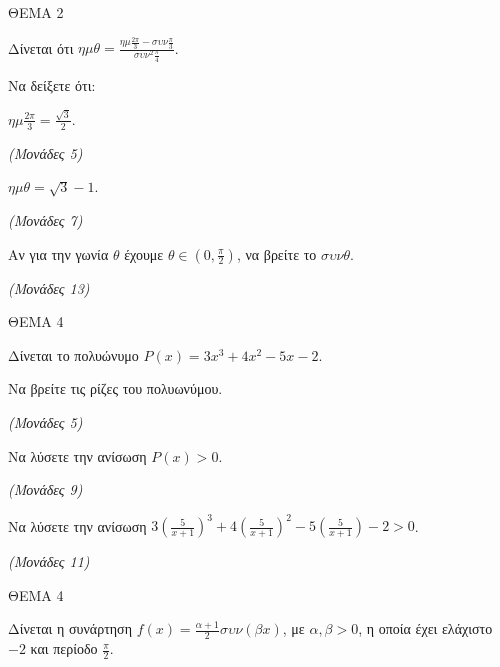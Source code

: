 \documentclass[11pt,a4paper,twoside]{book}
\newcommand{\monades}[1]{\hfill \textit{(Μονάδες #1)}}
\begin{document}
\vspace{4mm}

ΘΕΜΑ 2

Δίνεται ότι $\eta\mu\theta = \frac{\eta\mu\frac{2\pi}{3} - \sigma\upsilon\nu\frac{\pi}{3}}{\sigma\upsilon\nu^2\frac{\pi}{4}}$.

\begin{alist}
\item Να δείξετε ότι:

\begin{rlist}
\item $\eta\mu\frac{2\pi}{3} = \frac{\sqrt{3}}{2}$.

\monades{5}

\item $\eta\mu\theta = \sqrt{3} - 1$.

\monades{7}

\end{rlist}
\item Αν για την γωνία $\theta$ έχουμε $\theta \in \left(0, \frac{\pi}{2}\right)$, να βρείτε το $\sigma\upsilon\nu\theta$.

\monades{13}
\end{alist}

\vspace{4mm}

ΘΕΜΑ 4

Δίνεται το πολυώνυμο $P(x) = 3x^3 + 4x^2 - 5x - 2$.

\begin{alist}
\item Να βρείτε τις ρίζες του πολυωνύμου.

\monades{5}

\item Να λύσετε την ανίσωση $P(x) > 0$.

\monades{9}

\item Να λύσετε την ανίσωση $3\left(\frac{5}{x+1}\right)^3 + 4\left(\frac{5}{x+1}\right)^2 - 5\left(\frac{5}{x+1}\right) - 2 > 0$.

\monades{11}
\end{alist}

\vspace{4mm}

ΘΕΜΑ 4

Δίνεται η συνάρτηση $f(x) = \frac{\alpha+1}{2} \sigma\upsilon\nu(\beta x)$, με $\alpha, \beta > 0$, η οποία έχει ελάχιστο $-2$ και περίοδο $\frac{\pi}{2}$.
\end{document}
